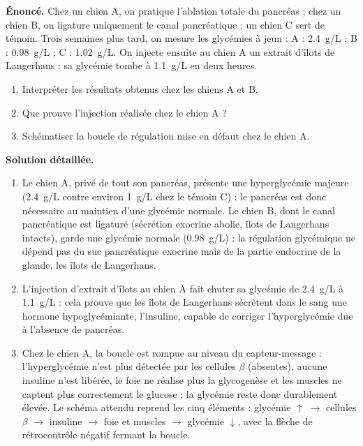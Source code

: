\documentclass[11pt]{article}
\begin{document}
\begin{exoresolu}
\textbf{Énoncé.} Chez un chien A, on pratique l'ablation totale du pancréas ; chez un chien B, on ligature uniquement le canal pancréatique ; un chien C sert de témoin. Trois semaines plus tard, on mesure les glycémies à jeun : A : \SI{2,4}{g/L} ; B : \SI{0,98}{g/L} ; C : \SI{1,02}{g/L}. On injecte ensuite au chien A un extrait d'îlots de Langerhans : sa glycémie tombe à \SI{1,1}{g/L} en deux heures.
\begin{enumerate}
\item Interpréter les résultats obtenus chez les chiens A et B.
\item Que prouve l'injection réalisée chez le chien A ?
\item Schématiser la boucle de régulation mise en défaut chez le chien A.
\end{enumerate}
\tcblower
\textbf{Solution détaillée.}
\begin{enumerate}
\item Le chien A, privé de tout son pancréas, présente une hyperglycémie majeure (\SI{2,4}{g/L} contre environ \SI{1}{g/L} chez le témoin C) : le pancréas est donc nécessaire au maintien d'une glycémie normale. Le chien B, dont le canal pancréatique est ligaturé (sécrétion exocrine abolie, îlots de Langerhans intacts), garde une glycémie normale (\SI{0,98}{g/L}) : la régulation glycémique ne dépend pas du suc pancréatique exocrine mais de la partie endocrine de la glande, les îlots de Langerhans.
\item L'injection d'extrait d'îlots au chien A fait chuter sa glycémie de \SI{2,4}{g/L} à \SI{1,1}{g/L} : cela prouve que les îlots de Langerhans sécrètent dans le sang une hormone hypoglycémiante, l'insuline, capable de corriger l'hyperglycémie due à l'absence de pancréas.
\item Chez le chien A, la boucle est rompue au niveau du capteur-message : l'hyperglycémie n'est plus détectée par les cellules $\beta$ (absentes), aucune insuline n'est libérée, le foie ne réalise plus la glycogenèse et les muscles ne captent plus correctement le glucose ; la glycémie reste donc durablement élevée. Le schéma attendu reprend les cinq éléments : glycémie $\uparrow$ $\rightarrow$ cellules $\beta$ $\rightarrow$ insuline $\rightarrow$ foie et muscles $\rightarrow$ glycémie $\downarrow$, avec la flèche de rétrocontrôle négatif fermant la boucle.
\end{enumerate}
\end{exoresolu}
\end{document}
